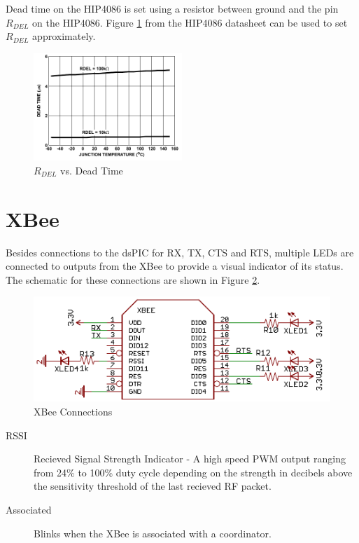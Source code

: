 \documentclass{article}
\begin{document}
Dead time on the HIP4086 is set using a resistor between ground and the pin $R_{DEL}$ on the HIP4086. Figure \ref{fig:deadtime} from the HIP4086 datasheet can be used to set $R_{DEL}$ approximately.
\begin{figure}[h]
	\centering
	\includegraphics[width=0.5\textwidth]{deadtime}
	\caption{ $R_{DEL}$ vs. Dead Time\protect\footnotemark}
	\label{fig:deadtime}
\end{figure}

\section{XBee}
Besides connections to the dsPIC for RX, TX, CTS and RTS, multiple LEDs are connected to outputs from the XBee to provide a visual indicator of its status. The schematic for these connections are shown in Figure \ref{xbee}.
\begin{figure}
	\caption{XBee Connections}
	\centering
	\label{xbee}
	\includegraphics{XbeeDatasheet}
\end{figure}
\begin{description}
\item[RSSI] Recieved Signal Strength Indicator - A high speed PWM output ranging from 24\% to 100\% duty cycle depending on the strength in decibels above the sensitivity threshold of the last recieved RF packet.
\item[Associated] Blinks when the XBee is associated with a coordinator.
\end{description}
\end{document}
